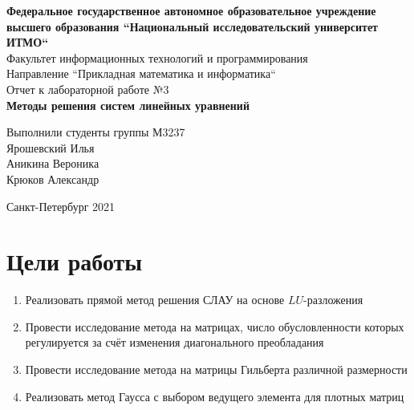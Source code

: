 \documentclass[english]{article}
\date{}
\title{}
\begin{document}
\begin{titlepage}
  \begin{center}
    \large\textbf{Федеральное государственное автономное образовательное учреждение высшего образования ``Национальный исследовательский университет ИТМО``} \\
    \vspace{0.5cm}
    Факультет информационных технологий и программирования \\
    \vspace{0.5cm}
    Направление ``Прикладная математика и информатика`` \\
    \vspace{3cm}
    Отчет к лабораторной работе №3 \\
    \vspace{0.5cm}
    \textbf{Методы решения систем линейных уравнений}
  \end{center}
  \vfill
  \begin{flushright}
    \large
    Выполнили студенты группы М3237 \\
    \vspace{0.5cm}
    Ярошевский Илья \\
    Аникина Вероника \\
    Крюков Александр
  \end{flushright}
  \vspace{3cm}
  \begin{center}
    Санкт-Петербург 2021
  \end{center}
\end{titlepage}

\section{Цели работы}

\begin{enumerate}
    \item Реализовать прямой метод решения СЛАУ на основе \(LU\)-разложения
    \item Провести исследование метода на матрицах, число обусловленности которых регулируется за счёт изменения диагонального  преобладания 
    \item Провести исследование метода на матрицы Гильберта различной размерности
    \item Реализовать метод Гаусса с выбором ведущего элемента для плотных матриц
\end{enumerate}
\end{document}
